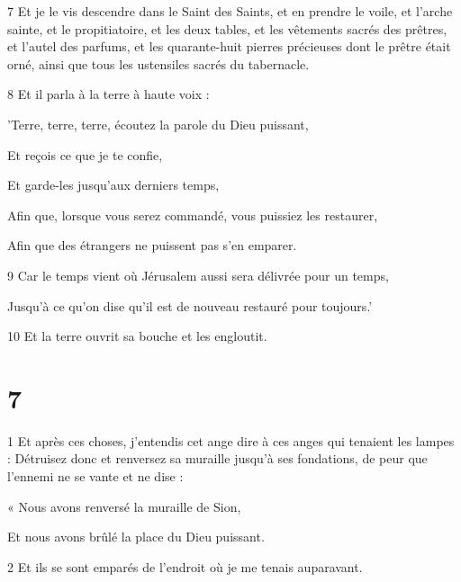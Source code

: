 \par 7 Et je le vis descendre dans le Saint des Saints, et en prendre le voile, et l'arche sainte, et le propitiatoire, et les deux tables, et les vêtements sacrés des prêtres, et l'autel des parfums, et les quarante-huit pierres précieuses dont le prêtre était orné, ainsi que tous les ustensiles sacrés du tabernacle.

\par 8 Et il parla à la terre à haute voix :

\par 'Terre, terre, terre, écoutez la parole du Dieu puissant,

\par Et reçois ce que je te confie,

\par Et garde-les jusqu'aux derniers temps,

\par Afin que, lorsque vous serez commandé, vous puissiez les restaurer,

\par Afin que des étrangers ne puissent pas s'en emparer.

\par 9 Car le temps vient où Jérusalem aussi sera délivrée pour un temps,

\par Jusqu'à ce qu'on dise qu'il est de nouveau restauré pour toujours.'

\par 10 Et la terre ouvrit sa bouche et les engloutit.

\chapter{7}

\par 1 Et après ces choses, j'entendis cet ange dire à ces anges qui tenaient les lampes : Détruisez donc et renversez sa muraille jusqu'à ses fondations, de peur que l'ennemi ne se vante et ne dise :

\par « Nous avons renversé la muraille de Sion,

\par Et nous avons brûlé la place du Dieu puissant.

\par 2 Et ils se sont emparés de l'endroit où je me tenais auparavant.



